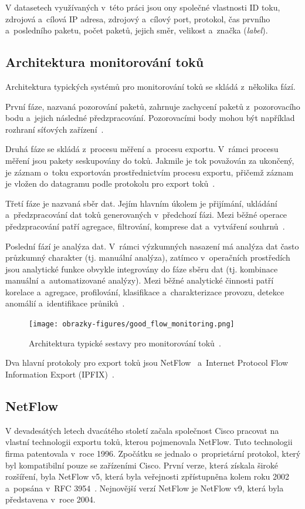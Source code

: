 V datasetech využívaných v~této práci jsou ony společné vlastnosti ID toku, zdrojová a~cílová IP adresa, zdrojový a~cílový port, protokol, čas prvního a~posledního paketu, počet paketů, jejich směr, velikost a~značka (\textit{label}).

\subsection{Architektura monitorování toků}
Architektura typických systémů pro monitorování toků se skládá z~několika fází. 

První fáze, nazvaná pozorování paketů, zahrnuje zachycení paketů z~pozorovacího bodu a~jejich následné předzpracování. Pozorovacími body mohou být například rozhraní síťových zařízení~\cite{flow_monitoring}.

Druhá fáze se skládá z~procesu měření a~procesu exportu. V~rámci procesu měření jsou pakety seskupovány do toků. Jakmile je tok považován za ukončený, je záznam o~toku exportován prostřednictvím procesu exportu, přičemž záznam je vložen do datagramu podle protokolu pro export toků~\cite{flow_monitoring}.

Třetí fáze je nazvaná sběr dat. Jejím hlavním úkolem je přijímání, ukládání a~předzpracování dat toků generovaných v~předchozí fázi. Mezi běžné operace předzpracování patří agregace, filtrování, komprese dat a~vytváření souhrnů~\cite{flow_monitoring}.

Poslední fází je analýza dat. V~rámci výzkumných nasazení má analýza dat často průzkumný charakter (tj. manuální analýza), zatímco v~operačních prostředích jsou analytické funkce obvykle integrovány do fáze sběru dat (tj. kombinace manuální a~automatizované analýzy). Mezi běžné analytické činnosti patří korelace a~agregace, profilování, klasifikace a~charakterizace provozu, detekce anomálií a~identifikace průniků~\cite{flow_monitoring}.
\begin{figure}[H]
	\centering
	\texttt{[image: obrazky-figures/good\_flow\_monitoring.png]}
	\caption{Architektura typické sestavy pro monitorování toků~\cite{flow_monitoring}.}
	\label{flow_monitoring}
\end{figure}


Dva hlavní protokoly pro export toků jsou NetFlow~\cite{rfc3954} a~Internet Protocol Flow Information Export (IPFIX)~\cite{rfc7011}.

\subsection{NetFlow}
V devadesátých letech dvacátého století začala společnost Cisco pracovat na vlastní technologii exportu toků, kterou pojmenovala NetFlow. Tuto technologii firma patentovala v~roce 1996. Zpočátku se jednalo o~proprietární protokol, který byl kompatibilní pouze se zařízeními Cisco. První verze, která získala široké rozšíření, byla NetFlow v5, která byla veřejnosti zpřístupněna kolem roku 2002 a~popsána v~RFC 3954~\cite{rfc3954}. Nejnovější verzí NetFlow je NetFlow v9, která byla představena v~roce 2004.


